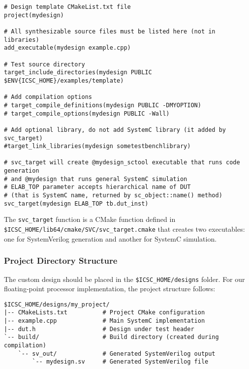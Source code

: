 \begin{lstlisting}[caption={ICSC Project CMakeLists.txt Configuration},label=lst:icsc_cmake]
# Design template CMakeList.txt file
project(mydesign)

# All synthesizable source files must be listed here (not in libraries)
add_executable(mydesign example.cpp)

# Test source directory
target_include_directories(mydesign PUBLIC $ENV{ICSC_HOME}/examples/template)

# Add compilation options
# target_compile_definitions(mydesign PUBLIC -DMYOPTION)
# target_compile_options(mydesign PUBLIC -Wall)

# Add optional library, do not add SystemC library (it added by svc_target)
#target_link_libraries(mydesign sometestbenchlibrary)

# svc_target will create @mydesign_sctool executable that runs code generation 
# and @mydesign that runs general SystemC simulation
# ELAB_TOP parameter accepts hierarchical name of DUT  
# (that is SystemC name, returned by sc_object::name() method)
svc_target(mydesign ELAB_TOP tb.dut_inst)
\end{lstlisting}

The \texttt{svc\_target} function is a CMake function defined in \linebreak
\texttt{\$ICSC\_HOME/lib64/cmake/SVC/svc\_target.cmake} that creates two executables: one for SystemVerilog generation and another for SystemC simulation.

\subsubsection{Project Directory Structure}
\label{subsubsec:project_directory}

The custom design should be placed in the \texttt{\$ICSC\_HOME/designs} folder. For our floating-point processor implementation, the project structure follows:

\begin{lstlisting}[caption={ICSC Project Directory Structure},label=lst:icsc_project_structure]
$ICSC_HOME/designs/my_project/
|-- CMakeLists.txt          # Project CMake configuration
|-- example.cpp             # Main SystemC implementation
|-- dut.h                   # Design under test header
`-- build/                  # Build directory (created during compilation)
    `-- sv_out/             # Generated SystemVerilog output
        `-- mydesign.sv     # Generated SystemVerilog file
\end{lstlisting}

